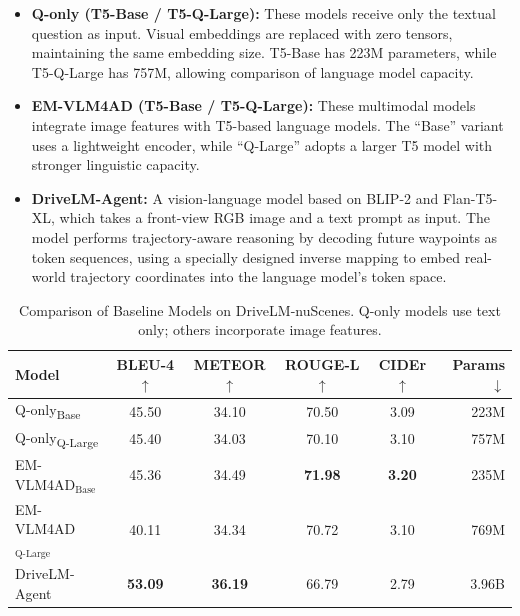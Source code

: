 \documentclass{article} %
\begin{document}
\begin{itemize}
    \item \textbf{Q-only (T5-Base / T5-Q-Large):} These models receive only the textual question as input. Visual embeddings are replaced with zero tensors, maintaining the same embedding size. T5-Base has 223M parameters, while T5-Q-Large has 757M, allowing comparison of language model capacity.
    
    \item \textbf{EM-VLM4AD (T5-Base / T5-Q-Large):} These multimodal models integrate image features with T5-based language models. The “Base” variant uses a lightweight encoder, while “Q-Large” adopts a larger T5 model with stronger linguistic capacity.
    
    \item \textbf{DriveLM-Agent:} A vision-language model based on BLIP-2 and Flan-T5-XL, which takes a front-view RGB image and a text prompt as input. The model performs trajectory-aware reasoning by decoding future waypoints as token sequences, using a specially designed inverse mapping to embed real-world trajectory coordinates into the language model’s token space.

\end{itemize}

\vspace{1mm}

\begin{table}[H]
    \centering
    \small
    \begin{tabular}{lccccr}
        \toprule
        \textbf{Model} & \textbf{BLEU-4} $\uparrow$ & \textbf{METEOR} $\uparrow$ & \textbf{ROUGE-L} $\uparrow$ & \textbf{CIDEr} $\uparrow$ & \textbf{Params} $\downarrow$ \\
        \midrule
        Q-only\textsubscript{Base}       & 45.50  & 34.10  & 70.50  & 3.09 & 223M \\
        Q-only\textsubscript{Q-Large}      & 45.40  & 34.03  & 70.10  & 3.10 & 757M \\
        EM-VLM4AD$_\text{Base}$   & 45.36 & 34.49 & \textbf{71.98} & \textbf{3.20}  & 235M \\
        EM-VLM4AD$_\text{Q-Large}$ & 40.11 & 34.34 & 70.72 & 3.10  & 769M \\
        DriveLM-Agent~\cite{gopalkrishnan2024multi} & \textbf{53.09} & \textbf{36.19} & 66.79 & 2.79 & 3.96B \\
        \bottomrule
    \end{tabular}
    \caption{Comparison of Baseline Models on DriveLM-nuScenes. Q-only models use text only; others incorporate image features.}
    \label{tab:merged-drive-performance}
\end{table}
\end{document}
